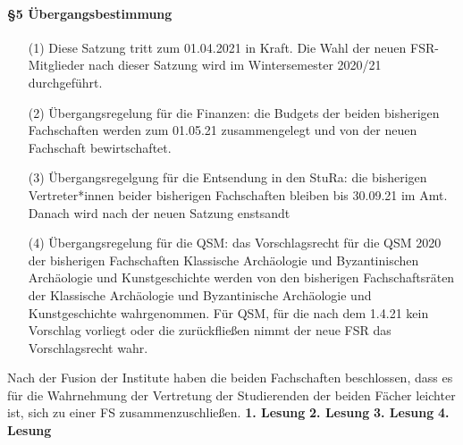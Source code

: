 {    \paragraph{§5 Übergangsbestimmung}
    \begin{enumerate}
        \item[(1)] Diese  Satzung  tritt  zum  01.04.2021  in  Kraft.  Die  Wahl  der  neuen  FSR-Mitglieder  nach dieser Satzung wird im Wintersemester 2020/21 durchgeführt.
        \item[(2)] Übergangsregelung  für  die  Finanzen:  die  Budgets  der  beiden  bisherigen  Fachschaften werden zum 01.05.21 zusammengelegt und von der neuen Fachschaft bewirtschaftet.
        \item[(3)] Übergangsregelgung für die Entsendung in den StuRa: die bisherigen Vertreter*innen beider bisherigen Fachschaften bleiben bis 30.09.21 im Amt. Danach wird nach der neuen Satzung enstsandt
        \item[(4)] Übergangsregelung  für  die  QSM:  das  Vorschlagsrecht  für  die  QSM  2020  der  bisherigen Fachschaften Klassische Archäologie und Byzantinischen Archäologie und Kunstgeschichte werden von den bisherigen Fachschaftsräten der Klassische Archäologie und Byzantinische Archäologie und Kunstgeschichte wahrgenommen. Für QSM, für die nach dem 1.4.21 kein Vorschlag vorliegt oder die zurückfließen nimmt der neue FSR das Vorschlagsrecht wahr.  
    \end{enumerate}
}{
    Nach der Fusion der Institute haben die beiden Fachschaften beschlossen, dass es für die Wahrnehmung der Vertretung der Studierenden der beiden Fächer leichter ist, sich zu einer FS zusammenzuschließen.
}{
    \textbf{1. Lesung}
    \ul{
    }
    \textbf{2. Lesung}
    \ul{
    }
    \textbf{3. Lesung}
    \ul{
    }
    \textbf{4. Lesung}
    \ul{
    }
}{

}

